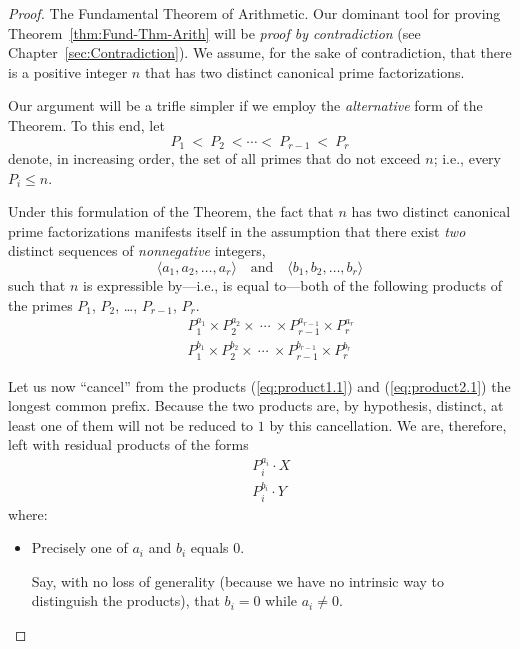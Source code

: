 \begin{proof}
{\small\sf The Fundamental Theorem of Arithmetic.}
%
Our dominant tool for proving Theorem~\ref{thm:Fund-Thm-Arith} will be {\em proof by contradiction} (see Chapter~\ref{sec:Contradiction}).  We assume, for the sake of contradiction, that there is a positive integer $n$ that has two distinct canonical prime factorizations.

Our argument will be a trifle simpler if we employ the {\em alternative} form of the Theorem.  To this end, let
\[ P_1 \ < \ P_2 \ < \cdots < \ P_{r-1} \ < \ P_r \]
denote, in increasing order, the set of all primes that do not exceed $n$; i.e., every $P_i \leq n$.

\smallskip

Under this formulation of the Theorem, the fact that $n$ has two distinct canonical prime factorizations manifests itself in the assumption that there exist {\em two} distinct sequences of {\em nonnegative} integers, 
\[ \langle a_1, a_2, \ldots, a_r \rangle \ \ \ \mbox{ and } \ \ \
\langle b_1, b_2, \ldots, b_r \rangle 
\]
such that $n$ is expressible by---i.e., is equal to---both of the following products of the primes $P_1$, $P_2$, \ldots, $P_{r-1}$, $P_r$.
\begin{eqnarray}
 & & 
\label{eq:product1.1}
P_1^{a_1} \times P_2^{a_2} \times \ \cdots \ \times P_{r-1}^{a_{r-1}} \times P_r^{a_r} \\
 & &
\label{eq:product2.1}
P_1^{b_1} \times P_2^{b_2} \times \ \cdots \ \times P_{r-1}^{b_{r-1}} \times P_r^{b_r}
\end{eqnarray}

\smallskip

Let us now ``cancel'' from the products (\ref{eq:product1.1}) and (\ref{eq:product2.1}) the longest common prefix.  Because the two products are, by hypothesis, distinct, at least one of them will not
be reduced to $1$ by this cancellation.  We are, therefore, left with residual products of the forms
\begin{eqnarray}
 & &
\label{eq:product1.2}
P_i^{a_i} \cdot X \\
 & &
\label{eq:product2.2}
P_i^{b_i} \cdot Y
\end{eqnarray}
where:
\begin{itemize}
\item
Precisely one of $a_i$ and $b_i$ equals $0$.

\smallskip

Say, with no loss of generality (because we have no intrinsic way to distinguish the products), that $b_i =0$ while $a_i \neq 0$.


\end{itemize}
\end{proof}
